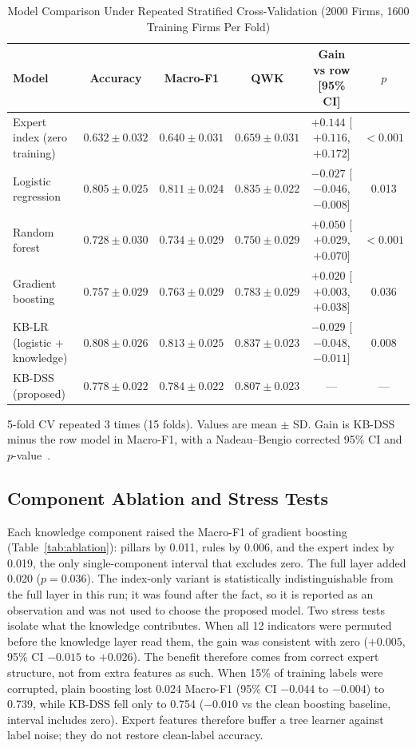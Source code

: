 \documentclass[10pt,journal,compsoc]{IEEEtran}
\begin{document}
\begin{table}[!t]
\caption{Model Comparison Under Repeated Stratified Cross-Validation (2000 Firms, 1600 Training Firms Per Fold)}
\label{tab:models}
\centering
\setlength{\tabcolsep}{4pt}
\scriptsize
\begin{tabular*}{\textwidth}{@{\extracolsep{\fill}}lccccc}
\toprule
Model & Accuracy & Macro-F1 & QWK & Gain vs row [95\% CI] & \(p\) \\
\midrule
Expert index (zero training)
  & \(0.632\pm0.032\) & \(0.640\pm0.031\) & \(0.659\pm0.031\) & \(+0.144\) [\(+0.116\), \(+0.172\)] & \(<0.001\) \\
Logistic regression
  & \(0.805\pm0.025\) & \(0.811\pm0.024\) & \(0.835\pm0.022\) & \(-0.027\) [\(-0.046\), \(-0.008\)] & 0.013 \\
Random forest
  & \(0.728\pm0.030\) & \(0.734\pm0.029\) & \(0.750\pm0.029\) & \(+0.050\) [\(+0.029\), \(+0.070\)] & \(<0.001\) \\
Gradient boosting
  & \(0.757\pm0.029\) & \(0.763\pm0.029\) & \(0.783\pm0.029\) & \(+0.020\) [\(+0.003\), \(+0.038\)] & 0.036 \\
KB-LR (logistic + knowledge)
  & \(0.808\pm0.026\) & \(0.813\pm0.025\) & \(0.837\pm0.023\) & \(-0.029\) [\(-0.048\), \(-0.011\)] & 0.008 \\
KB-DSS (proposed)
  & \(0.778\pm0.022\) & \(0.784\pm0.022\) & \(0.807\pm0.023\) & --- & --- \\
\bottomrule
\end{tabular*}
\vspace{2pt}

{\raggedright\scriptsize 5-fold CV repeated 3 times (15 folds). Values are mean \(\pm\) SD. Gain is KB-DSS minus the row model in Macro-F1, with a Nadeau--Bengio corrected 95\% CI and \(p\)-value~\cite{nadeau2003}.\par}
\end{table}

\subsection{Component Ablation and Stress Tests}

Each knowledge component raised the Macro-F1 of gradient boosting (Table~\ref{tab:ablation}): pillars by 0.011, rules by 0.006, and the expert index by 0.019, the only single-component interval that excludes zero. The full layer added 0.020 (\(p=0.036\)). The index-only variant is statistically indistinguishable from the full layer in this run; it was found after the fact, so it is reported as an observation and was not used to choose the proposed model. Two stress tests isolate what the knowledge contributes. When all 12 indicators were permuted before the knowledge layer read them, the gain was consistent with zero (\(+0.005\), 95\% CI \(-0.015\) to \(+0.026\)). The benefit therefore comes from correct expert structure, not from extra features as such. When 15\% of training labels were corrupted, plain boosting lost 0.024 Macro-F1 (95\% CI \(-0.044\) to \(-0.004\)) to 0.739, while KB-DSS fell only to 0.754 (\(-0.010\) vs the clean boosting baseline, interval includes zero). Expert features therefore buffer a tree learner against label noise; they do not restore clean-label accuracy.
\end{document}
